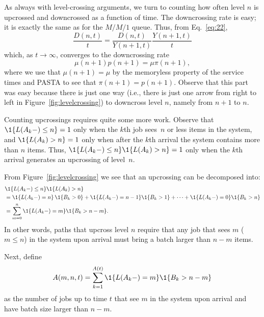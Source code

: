 As always with level-crossing arguments, we turn to counting how often
level $n$ is upcrossed and downcrossed as a function of time. The
downcrossing rate is easy; it is exactly the same as for the $M/M/1$
queue. Thus, from Eq.~\eqref{eq:22}, 
\begin{equation}
\frac{D(n,t)}t = \frac{D(n,t)}{Y(n+1,t)}\frac{Y(n+1,t)}t
\end{equation}
which, as $t\to\infty$, converges to the downcrossing rate
\begin{equation}
\mu(n+1) p(n+1) = \mu \pi(n+1),
\end{equation}
where we use that $\mu(n+1) = \mu$ by the memoryless property of the
service times and PASTA to see that $\pi(n+1)=p(n+1)$.  Observe that
this part was easy because there is just one way (i.e., there is just
one arrow from right to left in Figure~\ref{fig:levelcrossing}) to
downcross level $n$, namely from $n+1$ to $n$. 

Counting upcrossings requires quite some more work. Observe that
$\1{L(A_k-)\leq n}=1$ only when the $k$th job sees~$n$ or less items in the system, and
$\1{L(A_k) > n}=1$ only when after the $k$th arrival the system contains more than $n$ items. Thus, $\1{L(A_k-) \leq n}\1{ L(A_k)>n}=1$ only when the $k$th arrival generates an upcrossing of level~$n$. 


From Figure~\ref{fig:levelcrossing} we see that an upcrossing can be decomposed into:
\begin{equation*}
  \begin{split}
&\1{L(A_k-) \leq n}\1{L(A_k)>n}  \\
&=  \1{L(A_k-) =n}\, \1{B_k >0} + \1{L(A_k-) =n-1}\1{ B_k >1} +\cdots + \1{L(A_k-) =0}\1{B_k > n} \\
&= \sum_{m=0}^n \1{L(A_k-) =m}\1{B_k > n-m}.
  \end{split}
\end{equation*}
In other words, paths that upcross level $n$ require that any job that
sees $m$ ($m\leq n$) in the system upon arrival must bring a batch larger
than $n-m$ items.

Next, define 
\begin{equation*}
  A(m,n,t) = \sum_{k=1}^{A(t)}\1{L(A_k-) = m}\1{B_k > n-m}
\end{equation*}
as the number of jobs up to time $t$ that see $m$ in the system upon
arrival and have batch size larger than $n-m$. 

